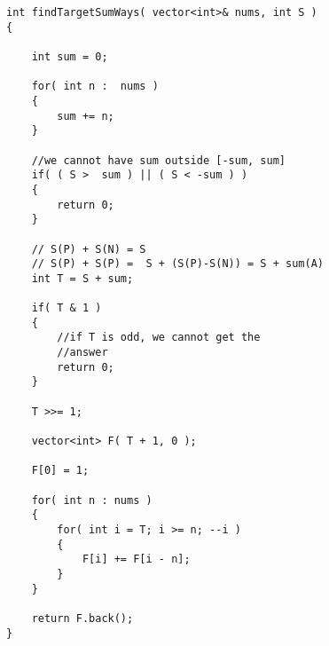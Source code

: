 \setcounter{lstlisting}{0}
\begin{lstlisting}[style=customc, caption={0-1 Kapsnack}]
int findTargetSumWays( vector<int>& nums, int S )
{

    int sum = 0;

    for( int n :  nums )
    {
        sum += n;
    }

    //we cannot have sum outside [-sum, sum]
    if( ( S >  sum ) || ( S < -sum ) )
    {
        return 0;
    }

    // S(P) + S(N) = S
    // S(P) + S(P) =  S + (S(P)-S(N)) = S + sum(A)
    int T = S + sum;

    if( T & 1 )
    {
        //if T is odd, we cannot get the
        //answer
        return 0;
    }

    T >>= 1;

    vector<int> F( T + 1, 0 );

    F[0] = 1;

    for( int n : nums )
    {
        for( int i = T; i >= n; --i )
        {
            F[i] += F[i - n];
        }
    }

    return F.back();
}

\end{lstlisting}
